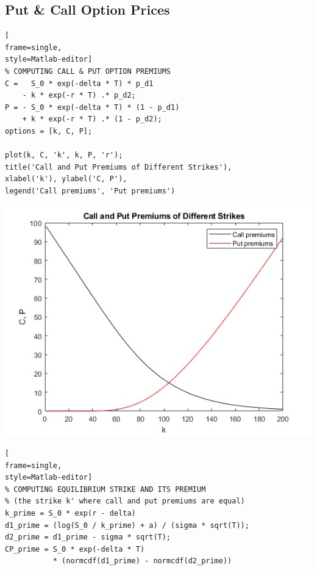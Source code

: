 \documentclass[letterpaper,12pt]{article}
\begin{document}
\subsection*{Put \& Call Option Prices}
\begin{lstlisting}[
frame=single,
style=Matlab-editor]
% COMPUTING CALL & PUT OPTION PREMIUMS
C =   S_0 * exp(-delta * T) * p_d1       
    - k * exp(-r * T) .* p_d2;
P = - S_0 * exp(-delta * T) * (1 - p_d1) 
    + k * exp(-r * T) .* (1 - p_d2);
options = [k, C, P];

plot(k, C, 'k', k, P, 'r');
title('Call and Put Premiums of Different Strikes'), 
xlabel('k'), ylabel('C, P'), 
legend('Call premiums', 'Put premiums')
\end{lstlisting}
\includegraphics[scale=0.8]{premiums}

\begin{lstlisting}[
frame=single,
style=Matlab-editor]
% COMPUTING EQUILIBRIUM STRIKE AND ITS PREMIUM
% (the strike k' where call and put premiums are equal)
k_prime = S_0 * exp(r - delta)
d1_prime = (log(S_0 / k_prime) + a) / (sigma * sqrt(T));    
d2_prime = d1_prime - sigma * sqrt(T);
CP_prime = S_0 * exp(-delta * T) 
           * (normcdf(d1_prime) - normcdf(d2_prime))
\end{lstlisting}
\end{document}
